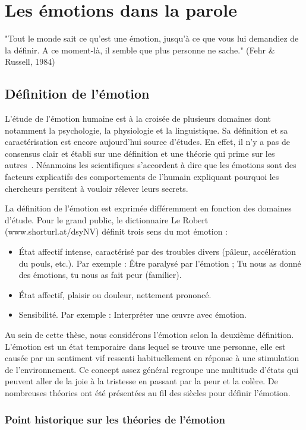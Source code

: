 \chapter{Les émotions dans la parole}
\label{chapitre1}
"Tout le monde sait ce qu’est une émotion, jusqu’à ce que vous lui demandiez de la définir. A ce moment-là, il semble que plus personne ne sache." (Fehr \& Russell, 1984)

 \section{Définition de l'émotion}
L'étude de l'émotion humaine est à la croisée de plusieurs domaines dont notamment la psychologie, la physiologie et la linguistique. Sa définition et sa caractérisation est encore aujourd'hui source d'études. En effet, il n'y a pas de consensus clair et établi sur une définition et une théorie qui prime sur les autres~\cite{Kleinginna1981,Strongman1996}. Néanmoins les scientifiques s'accordent à dire que les émotions sont des facteurs explicatifs des comportements de l'humain expliquant pourquoi les chercheurs persitent à vouloir rélever leurs secrets.

La définition de l'émotion est exprimée différemment en fonction des domaines d'étude. Pour le grand public, le dictionnaire Le Robert (www.shorturl.at/dsyNV) définit trois sens du mot émotion :
\begin{itemize}
    \item État affectif intense, caractérisé par des troubles divers (pâleur, accélération du pouls, etc.). Par exemple : Être paralysé par l'émotion ; Tu nous as donné des émotions, tu nous as fait peur (familier).
    \item État affectif, plaisir ou douleur, nettement prononcé.
    \item Sensibilité. Par exemple : Interpréter une œuvre avec émotion.
\end{itemize}
Au sein de cette thèse, nous considérons l'émotion selon la deuxième définition. L'émotion est un état temporaire dans lequel se trouve une personne, elle est causée par un sentiment vif ressenti habituellement en réponse à une stimulation de l'environnement. Ce concept assez général regroupe une multitude d'états qui peuvent aller de la joie à la tristesse en passant par la peur et la colère. De nombreuses théories ont été présentées au fil des siècles pour définir l'émotion.

\subsection{Point historique sur les théories de l'émotion}


